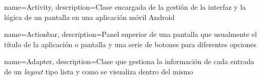 {
    name=Activity,
    description={Clase encargada de la gestión de la interfaz y la lógica de un pantalla en una aplicación móvil Android}
}

{
    name=Actionbar,
    description={Panel superior de una pantalla que usualmente el título de la aplicación o pantalla y una serie de botones para diferentes opciones}
}

{
    name=Adapter,
    description={Clase que gestiona la información de cada entrada de un \textit{layout} tipo lista y como se visualiza dentro del mismo}
}
